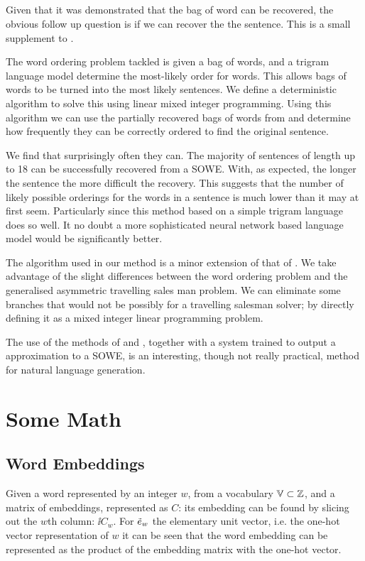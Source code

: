 \documentclass{book}
\begin{document}
\subsection{ }
Given that it was demonstrated that the bag of word can be recovered,
the obvious follow up question is if we can recover the the sentence.
This  is a small supplement to .

The word ordering problem tackled is given a bag of words,
and a trigram language model determine the most-likely order for words.
This allows bags of words to be turned into the most likely sentences.
We define a deterministic algorithm to solve this using linear mixed integer programming.
Using this algorithm we can use the partially recovered bags of words from  and determine how frequently they can be correctly ordered to find the original sentence.

We find that surprisingly often they can.
The majority of sentences of length up to 18 can be successfully recovered from a SOWE.
With, as expected, the longer the sentence the more difficult the recovery.
This suggests that the number of likely possible orderings for the words in a sentence is much lower than it may at first seem.
Particularly since this method based on a simple trigram language does so well.
It no doubt a more sophisticated neural network based language model would be significantly better.


The algorithm used in our method is a minor extension of that of \citet{Horvat2014}.
We take advantage of the slight differences between the word ordering problem and the generalised asymmetric travelling sales man problem.
We can eliminate some branches that would not be possibly for a travelling salesman solver; by directly defining it as a mixed integer linear programming problem.

The use of the methods of  and ,
together with a system trained to output a approximation to a SOWE, is an interesting, though not really practical, method for natural language generation.

\section{Some Math}
\subsection{Word Embeddings}
Given a word represented by an integer $w$, from a vocabulary $\mathbb{V} \subset \mathbb{Z}$,
and a matrix of embeddings, represented as $C$:
its embedding can be found by slicing out the $w$th column:
$\ii C_w$.
For $\iv e_w$ the elementary unit vector, i.e. the one-hot vector representation of $w$
it can be seen that the word embedding can be represented as the product of the embedding matrix with the one-hot vector.
\end{document}
